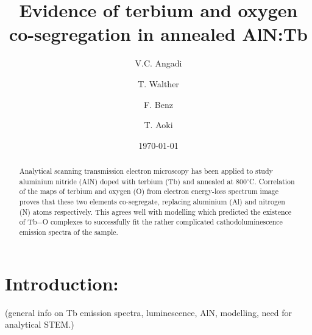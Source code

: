 \documentclass[%
 aip,
rsi,%
 amsmath,amssymb,
 reprint,%
]{revtex4-1}
\begin{document}

\title[Sample title]{Evidence of terbium and oxygen co-segregation in annealed AlN:Tb}%

\author{V.C. Angadi}

\author{T. Walther}%


\author{F. Benz}

\author{T. Aoki}

\date{\today}%

\begin{abstract}
Analytical scanning transmission electron microscopy has been applied to study aluminium nitride (AlN) doped with terbium (Tb) and annealed at $800^\circ$C. Correlation of the maps of terbium and oxygen (O) from electron energy-loss spectrum image proves that these two elements co-segregate, replacing aluminium (Al) and nitrogen (N) atoms respectively. This agrees well with modelling which predicted the existence of Tb$-$O complexes to successfully fit the rather complicated cathodoluminescence emission spectra of the sample.

\end{abstract}

\maketitle

\section{Introduction:}
\label{sec:Intro}
(general info on Tb emission spectra, luminescence, AlN, modelling, need for analytical STEM.)
\end{document}
